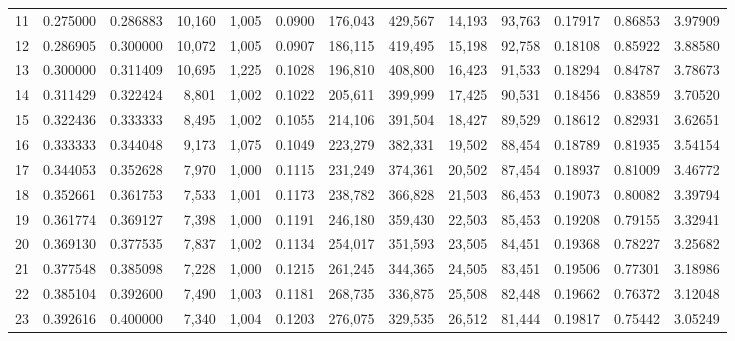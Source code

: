 \begin{tabular}{rrrrrrrrrrrrr}
11  &  0.275000 &  0.286883 &  10,160 &  1,005 &                                     0.0900 &  176,043 &  429,567 &   14,193 &   93,763 &  0.17917 &  0.86853 &  3.97909 \\
12  &  0.286905 &  0.300000 &  10,072 &  1,005 &                                     0.0907 &  186,115 &  419,495 &   15,198 &   92,758 &  0.18108 &  0.85922 &  3.88580 \\
13  &  0.300000 &  0.311409 &  10,695 &  1,225 &                                     0.1028 &  196,810 &  408,800 &   16,423 &   91,533 &  0.18294 &  0.84787 &  3.78673 \\
14  &  0.311429 &  0.322424 &   8,801 &  1,002 &                                     0.1022 &  205,611 &  399,999 &   17,425 &   90,531 &  0.18456 &  0.83859 &  3.70520 \\
15  &  0.322436 &  0.333333 &   8,495 &  1,002 &                                     0.1055 &  214,106 &  391,504 &   18,427 &   89,529 &  0.18612 &  0.82931 &  3.62651 \\
16  &  0.333333 &  0.344048 &   9,173 &  1,075 &                                     0.1049 &  223,279 &  382,331 &   19,502 &   88,454 &  0.18789 &  0.81935 &  3.54154 \\
17  &  0.344053 &  0.352628 &   7,970 &  1,000 &                                     0.1115 &  231,249 &  374,361 &   20,502 &   87,454 &  0.18937 &  0.81009 &  3.46772 \\
18  &  0.352661 &  0.361753 &   7,533 &  1,001 &                                     0.1173 &  238,782 &  366,828 &   21,503 &   86,453 &  0.19073 &  0.80082 &  3.39794 \\
19  &  0.361774 &  0.369127 &   7,398 &  1,000 &                                     0.1191 &  246,180 &  359,430 &   22,503 &   85,453 &  0.19208 &  0.79155 &  3.32941 \\
20  &  0.369130 &  0.377535 &   7,837 &  1,002 &                                     0.1134 &  254,017 &  351,593 &   23,505 &   84,451 &  0.19368 &  0.78227 &  3.25682 \\
21  &  0.377548 &  0.385098 &   7,228 &  1,000 &                                     0.1215 &  261,245 &  344,365 &   24,505 &   83,451 &  0.19506 &  0.77301 &  3.18986 \\
22  &  0.385104 &  0.392600 &   7,490 &  1,003 &                                     0.1181 &  268,735 &  336,875 &   25,508 &   82,448 &  0.19662 &  0.76372 &  3.12048 \\
23  &  0.392616 &  0.400000 &   7,340 &  1,004 &                                     0.1203 &  276,075 &  329,535 &   26,512 &   81,444 &  0.19817 &  0.75442 &  3.05249 \\

\end{tabular}
